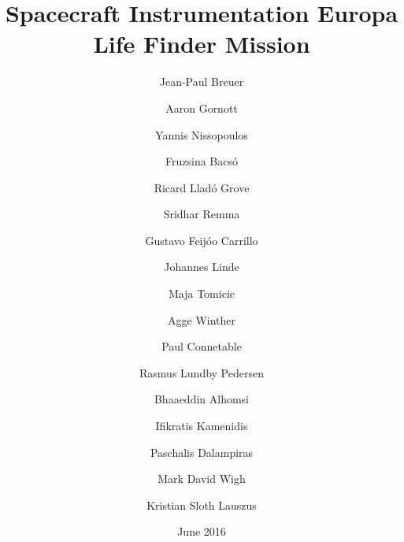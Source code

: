 \documentclass[12pt,twoside,openright,a4paper,final]{book}
\date{June 2016}
\begin{document}
\title{\textbf{Spacecraft Instrumentation Europa Life Finder Mission}}

\author{Jean-Paul Breuer}
\author{Aaron Gornott}
\author{Yannis Nissopoulos}
\author{Fruzsina Bacsó}
\author{Ricard Lladó Grove}
\author{Sridhar Remma}
\author{Gustavo Feijóo Carrillo}
\author{Johannes Linde}
\author{Maja Tomicic}
\author{Agge Winther}
\author{Paul Connetable}
\author{Rasmus Lundby Pedersen}
\author{Bhaaeddin Alhomsi}
\author{Ifikratis Kamenidis}
\author{Paschalis Dalampiras}
\author{Mark David Wigh}
\author{Kristian Sloth Lauszus}


\setcounter{Maxaffil}{0}
\renewcommand\Affilfont{\itshape\small}

\maketitle

\frontmatter



\tableofcontents

\mainmatter




























\appendix

\end{document}
